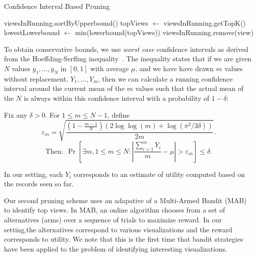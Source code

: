 


\begin{algorithm}
\caption{Confidence Interval Based Pruning}
\label{algo:ci_based_pruning}
\begin{algorithmic}[1]
\State viewsInRunning.sortByUpperbound()
\State topViews $\gets$ viewsInRunning.getTopK()
\State lowestLowerbound $\gets$ min(lowerbound(topViews))
\State viewsInRunning.remove(view)
\EndIf
\EndFor
\end{algorithmic}
\end{algorithm}

To obtain conservative bounds, we use {\it worst case} confidence intervals as derived from
the Hoeffding-Serfling inequality~\cite{serfling1974probability}.
The inequality states that if we are given $N$ values $y_1, \ldots, y_N$ in 
$[0, 1]$ with average $\mu$, and we have have drawn $m$ values without replacement, $Y_1, \ldots, Y_m$, 
then we can calculate a running confidence interval around the current mean 
of the $m$ values such that the actual mean of the $N$
is always within this confidence interval with a probability of $1 - \delta$:
\begin{theorem}
\label{thm:hs}

Fix any $\delta > 0$. For $1 \le m \le N-1$, define
{\small $$
\varepsilon_m = \sqrt{\frac{(1-\frac{m-1}N)(2\log \log (m) + \log(\pi^2/3\delta))}{2m}}.
$$
$$
\textrm{Then:} \ \   \Pr\left[ \exists m, 1 \le m \le N : 
  \left|\frac{\sum_{i=1}^m Y_i}{m} - \mu\right| > \varepsilon_m \right] 
\le \delta.
$$
}

\end{theorem}
In our setting, each $Y_i$ corresponds to an estimate of utility computed based on the
records seen so far. 


\label{sec:multi_armed_bandit}
Our second pruning scheme uses an adapative of a Multi-Armed Bandit (MAB)~\cite{bandits, AuerCF02, LaiR85} to identify top views.
In MAB, an online algorithm chooses from a set of alternatives (arms)
 over a sequence of trials to maximize reward.  In our setting,the  alternatives correspond to various visualizations and the reward corresponds
 to utility. 
We note that this is the first time that bandit strategies have been
applied to the problem of identifying interesting visualizations.


